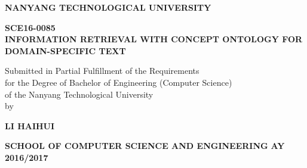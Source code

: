 \begin{titlepage}
\begin{center}

\uppercase{\textbf{\large NANYANG TECHNOLOGICAL UNIVERSITY}}
\vspace{6cm}

\uppercase{\textbf{SCE16-0085\\
Information Retrieval with Concept Ontology for Domain-Specific Text}}
\vspace{6cm}

Submitted in Partial Fulfillment of the Requirements\\
for the Degree of Bachelor of Engineering (Computer Science)\\
of the Nanyang Technological University\\
\vspace{0.8cm}
by
\vspace{0.8cm}

\uppercase{\textbf{Li Haihui}}
\vfill

\textbf{SCHOOL OF COMPUTER SCIENCE AND ENGINEERING}
\linebreak
\textbf{AY 2016/2017}

\end{center}
\end{titlepage}